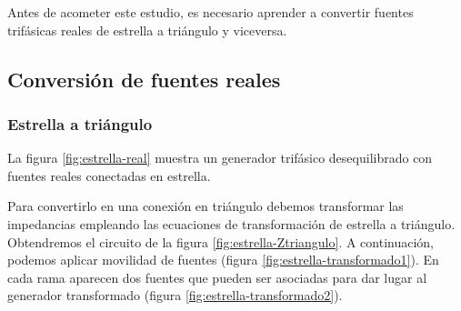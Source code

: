 Antes de acometer este estudio, es necesario aprender a convertir fuentes trifásicas reales de estrella a triángulo y viceversa.

\subsection{Conversión de fuentes reales}
\label{sec:conversion-fuentes-reales}

\subsubsection{Estrella a triángulo}

La figura \ref{fig:estrella-real} muestra un generador trifásico desequilibrado con fuentes reales conectadas en estrella.

Para convertirlo en una conexión en triángulo debemos transformar las impedancias empleando las ecuaciones de transformación de estrella a triángulo. Obtendremos el circuito de la figura \ref{fig:estrella-Ztriangulo}. A continuación, podemos aplicar movilidad de fuentes (figura \ref{fig:estrella-transformado1}). En cada rama aparecen dos fuentes que pueden ser asociadas para dar lugar al generador transformado (figura \ref{fig:estrella-transformado2}).

